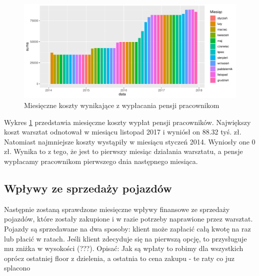\documentclass{article}\usepackage[]{graphicx}\usepackage[]{xcolor}
\makeatletter
\def\maxwidth{ %
  \ifdim\Gin@nat@width>\linewidth
    \linewidth
  \else
    \Gin@nat@width
  \fi
}
\newenvironment{knitrout}{}{} %
\makeatother
\begin{document}
\begin{knitrout}
\color{fgcolor}\begin{figure}[H]

{\centering \includegraphics[width=\maxwidth]{figure/fig_pracownicy-1} 

}

\caption[Miesięczne koszty wynikające z wypłacania pensji pracownikom]{Miesięczne koszty wynikające z wypłacania pensji pracownikom}\label{fig:fig_pracownicy}
\end{figure}

\end{knitrout}

Wykres \ref{fig:fig_pracownicy} przedstawia miesięczne koszty wypłat pensji pracowników. Największy koszt warsztat odnotował w miesiącu listopad 2017 i wyniósł on 88.32 tyś. zł. 
Natomiast najmniejsze koszty wystąpiły w miesiącu styczeń 2014. Wyniosły one 0 zł. Wynika to z tego, że jest to pierwszy miesiąc działania warsztatu, a pensje wypłacamy pracownikom pierwszego dnia następnego miesiąca.

\subsection{Wpływy ze sprzedaży pojazdów}

Następnie zostaną sprawdzone miesięczne wpływy finansowe ze sprzedaży pojazdów, które zostały zakupione i w razie potrzeby naprawione przez warsztat. Pojazdy są sprzedawane na dwa sposoby: klient może zapłacić całą kwotę na raz lub płacić w ratach. {\color{red}Jeśli klient zdecyduje się na pierwszą opcję, to przysługuje mu zniżka w wysokości (???).} {\color{red}Opisać: Jak są wpłaty to robimy dla wszystkich oprócz ostatniej floor z dzielenia, a ostatnia to cena zakupu - te raty co juz splacono}
\end{document}
